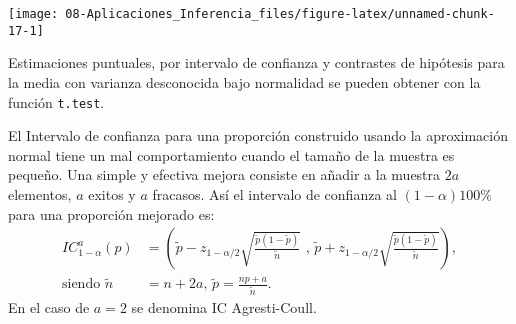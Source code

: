 \documentclass[
]{book}
\theoremstyle{break}
\theoremstyle{definition}
\theoremstyle{definition}
\theoremstyle{definition}
\theoremstyle{remark}
\let\BeginKnitrBlock\begin \let\EndKnitrBlock\end
\begin{document}
\begin{center}\texttt{[image: 08-Aplicaciones\_Inferencia\_files/figure-latex/unnamed-chunk-17-1]} \end{center}

\BeginKnitrBlock{remark}
\iffalse{} {Nota: } \fi{}Estimaciones puntuales, por intervalo de confianza y contrastes de hipótesis
para la media con varianza desconocida bajo normalidad
se pueden obtener con la función \texttt{t.test}.
\EndKnitrBlock{remark}

\vspace{0.5cm}

\BeginKnitrBlock{exercise}
\protect\hypertarget{exr:unnamed-chunk-19}{}{\label{exr:unnamed-chunk-19} }
\EndKnitrBlock{exercise}

El Intervalo de confianza para una proporción construido usando la
aproximación normal tiene un mal comportamiento cuando el tamaño de
la muestra es pequeño. Una simple y efectiva mejora consiste en
añadir a la muestra \(2a\) elementos, \(a\) exitos y \(a\) fracasos. Así
el intervalo de confianza al \(\left( 1-\alpha\right) 100\%\) para
una proporción mejorado es:
\[\begin{aligned}
IC_{1-\alpha}^{a}\left(  p\right)   
& =\left(  \tilde{p}-z_{1-\alpha/2}\sqrt{\frac{\tilde{p}(1-\tilde{p})}{\tilde{n}}} \text{ , }
\tilde{p}+z_{1-\alpha/2}\sqrt{\frac{\tilde{p}(1-\tilde{p})}{\tilde{n}}}\right)  ,\\
\text{siendo }\tilde{n} & = n+2a \text{, } \tilde{p} = \frac{np+a}{\tilde{n}}.
\end{aligned}\]
En el caso de \(a=2\) se denomina IC Agresti-Coull.
\end{document}
